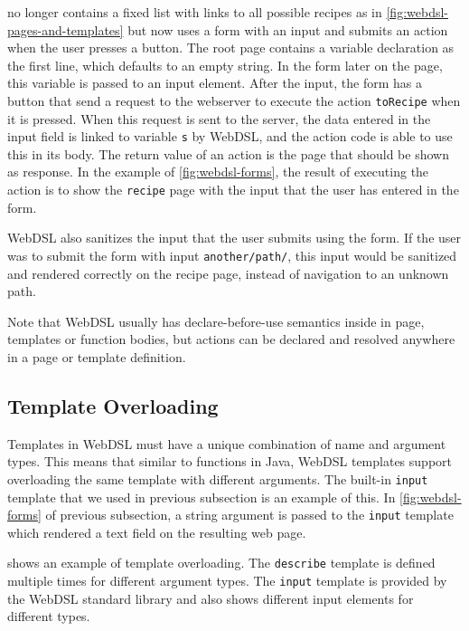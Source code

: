        no longer contains a fixed list with links to all possible recipes as in \cref{fig:webdsl-pages-and-templates} but now uses a form with an input and submits an action when the user presses a button. The root page contains a variable declaration as the first line, which defaults to an empty string. In the form later on the page, this variable is passed to an input element. After the input, the form has a button that send a request to the webserver to execute the action \texttt{toRecipe} when it is pressed. When this request is sent to the server, the data entered in the input field is linked to variable \texttt{s} by WebDSL, and the action code is able to use this in its body. The return value of an action is the page that should be shown as response. In the example of \cref{fig:webdsl-forms}, the result of executing the action is to show the \texttt{recipe} page with the input that the user has entered in the form.

      WebDSL also sanitizes the input that the user submits using the form. If the user was to submit the form with input \texttt{another/path/}, this input would be sanitized and rendered correctly on the recipe page, instead of navigation to an unknown path.

      Note that WebDSL usually has declare-before-use semantics inside in page, templates or function bodies, but actions can be declared and resolved anywhere in a page or template definition.

    \subsection{\label{subsec:template-overloading}Template Overloading}

      Templates in WebDSL must have a unique combination of name and argument types. This means that similar to functions in Java, WebDSL templates support overloading the same template with different arguments. The built-in \texttt{input} template that we used in previous subsection is an example of this. In \cref{fig:webdsl-forms} of previous subsection, a string argument is passed to the \texttt{input} template which rendered a text field on the resulting web page.

       shows an example of template overloading. The \texttt{describe} template is defined multiple times for different argument types. The \texttt{input} template is provided by the WebDSL standard library and also shows different input elements for different types.

